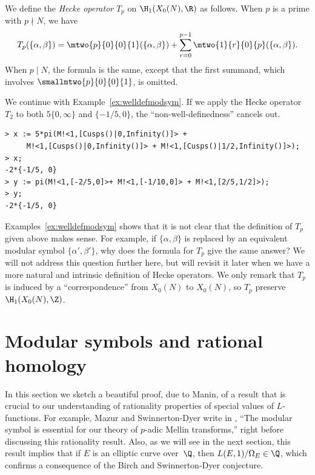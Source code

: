 \documentclass{report}
\begin{document}
\begin{definition}
We define the {\em Hecke operator} $T_p$ on $\H_1(X_0(N),\R)$ as
follows. When $p$ is a prime with $p\nmid N$, we have
\[
 T_p(\{\alpha,\beta\}) = \mtwo{p}{0}{0}{1}(\{\alpha,\beta\}) + \sum_{r=0}^{p-1}\mtwo{1}{r}{0}{p}(\{\alpha,\beta\}).
\]
When $p\mid N$, the formula is the same, except that the first
summand, which involves $\smallmtwo{p}{0}{0}{1}$, is omitted.
\end{definition}

\begin{example}\label{ex:heckeopmodsym}
We continue with Example~\ref{ex:welldefmodsym}. If we apply the Hecke operator
$T_2$ to both $5\{0,\infty\}$ and $\{-1/5,0\}$, the
``non-well-definedness'' cancels out.
\begin{verbatim}
> x := 5*pi(M!<1,[Cusps()|0,Infinity()]> +
     M!<1,[Cusps()|0,Infinity()]> + M!<1,[Cusps()|1/2,Infinity()]>);
> x;
-2*{-1/5, 0}
> y := pi(M!<1,[-2/5,0]>+ M!<1,[-1/10,0]> + M!<1,[2/5,1/2]>);
> y;
-2*{-1/5, 0}
\end{verbatim}
\end{example}

Examples~\ref{ex:welldefmodsym} shows that it is not clear that
the definition of $T_p$ given above makes sense.  For example, if
$\{\alpha,\beta\}$ is replaced by an equivalent modular symbol
$\{\alpha',\beta'\}$, why does the formula for $T_p$ give the same
answer? We will not address this question further here, but will
revisit it later when we
have a more natural and intrinsic definition of Hecke operators.
We only remark that $T_p$ is induced by a ``correspondence'' from
$X_0(N)$ to $X_0(N)$, so $T_p$ preserve $\H_1(X_0(N),\Z)$.

\section{Modular symbols and rational homology}
In this section we sketch a beautiful proof, due to Manin, of a
result that is crucial to our understanding of rationality
properties of special values of $L$-functions.  For example, Mazur
and Swinnerton-Dyer write in
\cite[\S6]{mazur-swinnerton-dyer:arithmetic}, ``The modular symbol
is essential for our theory of $p$-adic Mellin transforms,'' right
before discussing this rationality result.  Also, as we will see
in the next section, this result implies that if $E$ is an
elliptic curve over~$\Q$, then $L(E,1)/\Omega_E\in\Q$, which
confirms a consequence of the Birch and Swinnerton-Dyer
conjecture.
\end{document}

